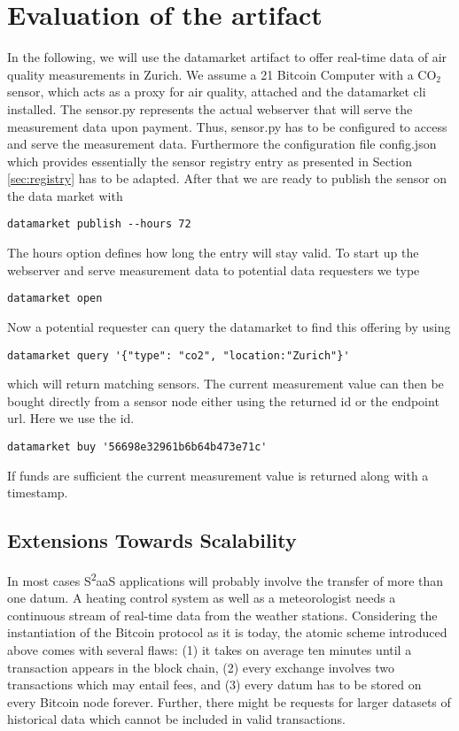 \section{Evaluation of the artifact}
\label{sec:eval}
In the following, we will use the datamarket artifact to offer real-time data of air quality measurements in Zurich.
We assume a 21 Bitcoin Computer with a CO$_{2}$ sensor, which acts as a proxy for air quality, attached and the datamarket cli installed. The sensor.py represents the actual webserver that will serve the measurement data upon payment. Thus, sensor.py has to be configured to access and serve the measurement data. Furthermore the configuration file config.json which provides essentially the sensor registry entry as presented in Section \ref{sec:registry} has to be adapted. After that we are ready to publish the sensor on the data market with
\begin{lstlisting}[basicstyle=\ttfamily\small]
datamarket publish --hours 72
\end{lstlisting}
The hours option defines how long the entry will stay valid. To start up the webserver and serve measurement data to potential data requesters we type
\begin{lstlisting}[basicstyle=\ttfamily\small]
datamarket open
\end{lstlisting}
Now a potential requester can query the datamarket to find this offering by using
\begin{lstlisting}[basicstyle=\ttfamily\small]
datamarket query '{"type": "co2", "location:"Zurich"}'
\end{lstlisting}
which will return matching sensors. The current measurement value can then be bought directly from a sensor node either using the returned id or the endpoint url. Here we use the id.
\begin{lstlisting}[basicstyle=\ttfamily\small]
datamarket buy '56698e32961b6b64b473e71c'
\end{lstlisting}
If funds are sufficient the current measurement value is returned along with a timestamp.


\subsection{Extensions Towards Scalability}
\label{subsec:extensions}
In most cases S\textsuperscript{2}aaS applications will probably involve the transfer of more than one datum. A heating control system as well as a meteorologist needs a continuous stream of real-time data from the weather stations. Considering the instantiation of the Bitcoin protocol as it is today, the atomic scheme introduced above comes with several flaws: (1) it takes on average ten minutes until a transaction appears in the block chain, (2) every exchange involves two transactions which may entail fees, and (3) every datum has to be stored on every Bitcoin node forever. Further, there might be requests for larger datasets of historical data which cannot be included in valid transactions.

